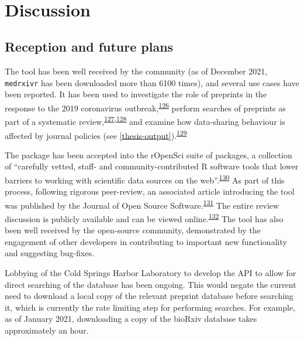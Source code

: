 \documentclass[a4paper, twoside]{templates/ociamthesis}
\begin{document}
~

\hypertarget{discussion}{%
\section{Discussion}\label{discussion}}

\hypertarget{reception-and-future-plans}{%
\subsection{Reception and future plans}\label{reception-and-future-plans}}

The tool has been well received by the community (as of December 2021, \texttt{medrxivr} has been downloaded more than 6100 times), and several use cases have been reported. It has been used to investigate the role of preprints in the response to the 2019 coronavirus outbreak,\textsuperscript{\protect\hyperlink{ref-kodvanj2020}{126}} perform searches of preprints as part of a systematic review,\textsuperscript{\protect\hyperlink{ref-noone2020}{127},\protect\hyperlink{ref-grassly2020}{128}} and examine how data-sharing behaviour is affected by journal policies (see \ref{thesis-output}).\textsuperscript{\protect\hyperlink{ref-mcguinness2020DAScomparison}{129}}

The package has been accepted into the rOpenSci suite of packages, a collection of ``carefully vetted, staff- and community-contributed R software tools that lower barriers to working with scientific data sources on the web''.\textsuperscript{\protect\hyperlink{ref-boettiger2015}{130}} As part of this process, following rigorous peer-review, an associated article introducing the tool was published by the Journal of Open Source Software.\textsuperscript{\protect\hyperlink{ref-mcguinness2020medrxivr}{131}} The entire review discussion is publicly available and can be viewed online.\textsuperscript{\protect\hyperlink{ref-zotero-15016}{132}} The tool has also been well received by the open-source community, demonstrated by the engagement of other developers in contributing to important new functionality and suggesting bug-fixes.

Lobbying of the Cold Springs Harbor Laboratory to develop the API to allow for direct searching of the database has been ongoing. This would negate the current need to download a local copy of the relevant preprint database before searching it, which is currently the rate limiting step for performing searches. For example, as of January 2021, downloading a copy of the bioRxiv database takes approximately an hour.
\end{document}
